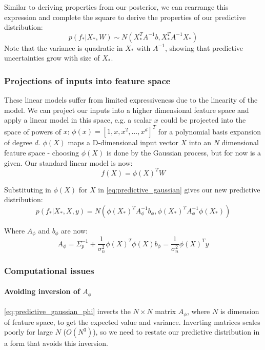 \documentclass[10pt]{article}
\begin{document}
Similar to deriving properties from our posterior, we can rearrange this expression and complete the square to derive the properties of our predictive distribution:
\begin{equation} \label{eq:predictive_gaussian}
    p(f_*|X_*,W) \sim N(X_*^TA^{-1}b, X_*^TA^{-1}X_*)
\end{equation}
Note that the variance is quadratic in $X_*$ with $A^{-1}$, showing that predictive uncertainties grow with size of $X_*$.

\subsubsection{Projections of inputs into feature space}
These linear models suffer from limited expressiveness due to the linearity of the model. We can project our inputs into a higher dimensional feature space and apply a linear model in this space, e.g. a scalar $x$ could be projected into the space of powers of $x$: $\phi(x) = [1, x, x^2, \ldots, x^d]^T$ for a polynomial basis expansion of degree $d$. $\phi(X)$ maps a D-dimensional input vector $X$ into an $N$ dimensional feature space - choosing $\phi(X)$ is done by the Gaussian process, but for now is a given. Our standard linear model is now:
\begin{equation*}
    f(X) = \phi(X)^T W
\end{equation*}

Substituting in $\phi(X)$ for $X$ in \ref{eq:predictive_gaussian} gives our new predictive distribution:
\begin{equation} \label{eq:predictive_gaussian_phi}
    p(f_*|X_*,X,y) = N(\phi(X_*)^TA_{\phi}^{-1}b_{\phi} , \phi(X_*)^TA_{\phi}^{-1}\phi(X_*))
\end{equation}

Where $A_{\phi}$ and $b_{\phi}$ are now:
\begin{equation*}
    A_{\phi} = \Sigma_p^{-1} + \frac{1}{\sigma^2_n}\phi(X)^T\phi(X)
    b_{\phi} = \frac{1}{\sigma^2_n}\phi(X)^Ty
\end{equation*}

\subsubsection{Computational issues}
\paragraph{Avoiding inversion of $A_{\phi}$}
\ref{eq:predictive_gaussian_phi} inverts the $N \times N$ matrix $A_{\phi}$, where $N$ is dimension of feature space, to get the expected value and variance. Inverting matrices scales poorly for large $N$ ($O(N^3)$), so we need to restate our predictive distribution in a form that avoids this inversion.
\end{document}
